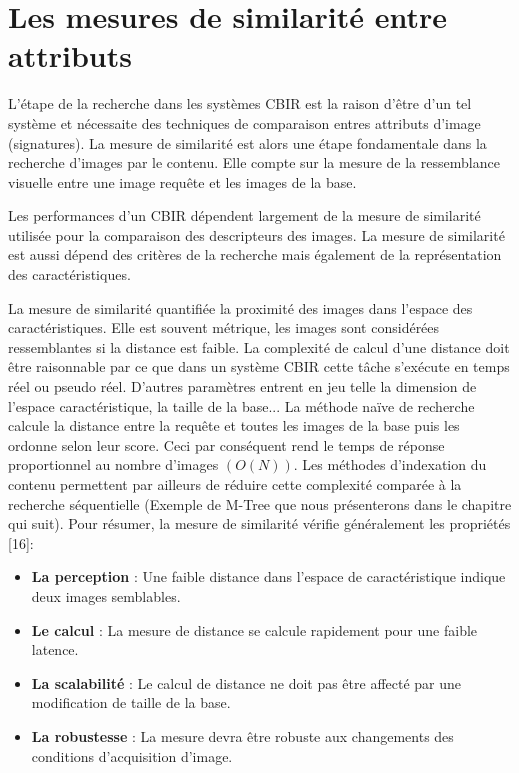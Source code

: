 \section{Les mesures de similarité entre attributs}
L'étape de la recherche dans les systèmes CBIR est la raison d'être d'un tel système et nécessaite des techniques de comparaison entres attributs d'image (signatures). La mesure de similarité est alors une étape fondamentale dans la recherche d'images par le contenu. Elle compte sur la mesure de la ressemblance visuelle entre une image requête et les images de la base. 

Les performances d'un CBIR dépendent largement de la mesure de similarité utilisée pour la comparaison des descripteurs des images. La mesure de similarité est aussi dépend des critères de la recherche mais également de la représentation des caractéristiques.

La mesure de similarité quantifiée la proximité des images dans l'espace des caractéristiques. Elle est souvent métrique, les images sont considérées ressemblantes si la distance est faible. La complexité de calcul d'une distance doit être raisonnable par ce que dans un système CBIR cette tâche s'exécute en temps réel ou pseudo réel. D'autres paramètres entrent en jeu telle la dimension de l'espace caractéristique, la taille de la base... La méthode naïve de recherche calcule la distance entre la requête et toutes les images de la base puis les ordonne selon leur score. Ceci par conséquent rend le temps de réponse proportionnel au nombre d'images $ (O(N)) $. Les méthodes d'indexation du contenu permettent par ailleurs de réduire cette complexité comparée à la recherche séquentielle (Exemple de M-Tree que nous présenterons dans le chapitre qui suit). Pour résumer, la mesure de similarité vérifie généralement les propriétés [16]:

\begin{itemize}
	\item  \textbf{La perception} : Une faible distance dans l'espace de caractéristique indique deux images semblables.
	
	\item \textbf{Le calcul} : La mesure de distance se calcule rapidement pour une faible latence.
	
	\item \textbf{La scalabilité }: Le calcul de distance ne doit pas être affecté par une modification de taille de la base.
	
	\item \textbf{La robustesse} : La mesure devra être robuste aux changements des conditions d'acquisition d'image.
\end{itemize}


